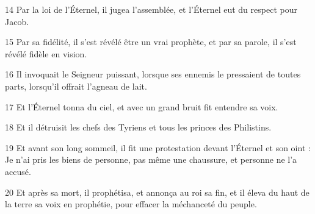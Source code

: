 \par 14 Par la loi de l'Éternel, il jugea l'assemblée, et l'Éternel eut du respect pour Jacob.
\par 15 Par sa fidélité, il s'est révélé être un vrai prophète, et par sa parole, il s'est révélé fidèle en vision.
\par 16 Il invoquait le Seigneur puissant, lorsque ses ennemis le pressaient de toutes parts, lorsqu'il offrait l'agneau de lait.
\par 17 Et l'Éternel tonna du ciel, et avec un grand bruit fit entendre sa voix.
\par 18 Et il détruisit les chefs des Tyriens et tous les princes des Philistins.
\par 19 Et avant son long sommeil, il fit une protestation devant l'Éternel et son oint : Je n'ai pris les biens de personne, pas même une chaussure, et personne ne l'a accusé.
\par 20 Et après sa mort, il prophétisa, et annonça au roi sa fin, et il éleva du haut de la terre sa voix en prophétie, pour effacer la méchanceté du peuple.


